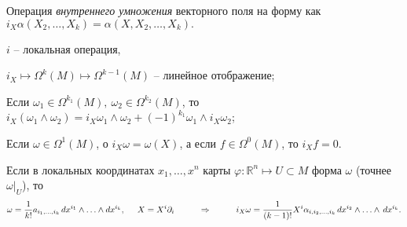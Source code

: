 \begin{to_def} 
    Операция \textit{внутреннего умножения} векторного поля на форму как
    $ i_X \alpha(X_2, \ldots, X_k) = \alpha(X, X_2, \ldots, X_k).$
\end{to_def}

\begin{enumerate*}
    \item $i$ -- локальная операция,
    \item $i_X \mapsto \Omega^k (M) \mapsto \Omega^{k-1}(M)$ -- линейное отображение;
    \item Если $\omega_1 \in \Omega^{k_1}(M), \ \omega_2 \in \Omega^{k_2}(M)$, то $i_X(\omega_1 \wedge \omega_2) = i_X \omega_1 \wedge \omega_2 + (-1)^{k_1} \omega_1 \wedge i_X \omega_2$;
    \item Если $\omega \in \Omega^1 (M)$, о $i_X \omega = \omega(X)$, а если $f \in \Omega^0 (M)$, то $i_X f = 0$.
\end{enumerate*}


Если в локальных координатах $x_1,\ldots,x^n$ карты $\varphi \colon \mathbb{R}^n \mapsto U \subset M$ форма $\omega$ (точнее $\omega|_U$), то
\begin{equation*}
\omega = \frac{1}{k!} a_{i_1,\ldots,i_k}\, d x^{i_1}\wedge\ldots \wedge d x^{i_k},
\hspace{0.5cm} 
X = X^i \partial_i
\hspace{1cm} \Rightarrow \hspace{1cm} 
    i_X \omega = \frac{1}{(k-1)!}  X^i \alpha_{i,i_2,\ldots,i_k} \, d x^{i_2} \wedge \ldots \wedge \, d x^{i_k}.
\end{equation*}